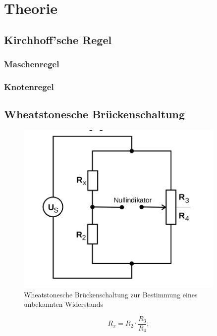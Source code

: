 \section{Theorie}
\label{sec:Theorie}

\subsection{Kirchhoff'sche Regel}

\subsubsection{Maschenregel}
\blindtext
\subsubsection{Knotenregel}
\blindtext
\subsection{Wheatstonesche Brückenschaltung}
\begin{figure}
  \centering
  \includegraphics[width=0.9\textwidth]{Bilder/Wheatstone_bruecke.png}
  \caption{Wheatstonesche Brückenschaltung zur Bestimmung eines unbekannten Widerstands \cite{Anleitung}}
  \label{fig:wheatstonebrücke}
\end{figure}
\blindtext
\begin{equation}
  R_x=R_2 \cdot \frac{R_3}{R_4};
\label{eqn:widerstand}
\end{equation}
